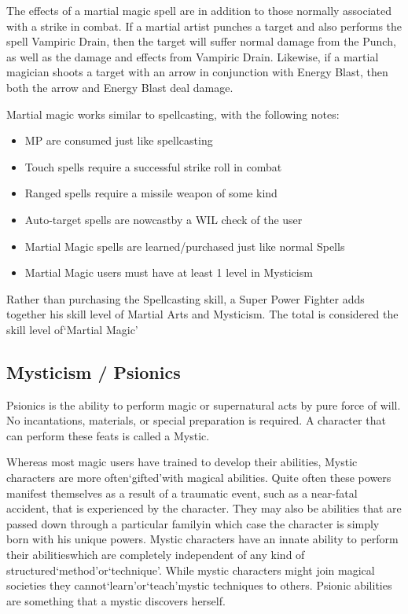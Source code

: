 \documentclass[twoside]{book}
\begin{document}
    {  
    The effects of a martial magic spell are in addition to those normally associated with a strike in combat. If a martial artist punches a target and also performs the spell Vampiric Drain, then the target will suffer normal damage from the Punch, as well as the damage and effects from Vampiric Drain. Likewise, if a martial magician shoots a target with an arrow in conjunction with Energy Blast, then both the arrow and Energy Blast deal damage.
    }
  
    {  
    Martial magic works similar to spellcasting, with the following notes:
    }
  
\begin{itemize}
      
  \item MP are consumed just like spellcasting
  \item Touch spells require a successful strike roll in combat
  \item Ranged spells require a missile weapon of some kind
  \item Auto-target spells are nowcastby a WIL check of the user
  \item Martial Magic spells are learned/purchased just like normal Spells
  \item Martial Magic users must have at least 1 level in Mysticism
\end{itemize}
  
    {  
    Rather than purchasing the Spellcasting skill, a Super Power Fighter adds together his skill level of Martial Arts and Mysticism. The total is considered the skill level of`Martial Magic'
    }
  
    

\subsection{Mysticism / Psionics}
    
    {  
    Psionics is the ability to perform magic or supernatural acts by pure force of will. No incantations, materials, or special preparation is required. A character that can perform these feats is called a Mystic.
    }
  
    {  
    Whereas most magic users have trained to develop their abilities, Mystic characters are more often`gifted'with magical abilities. Quite often these powers manifest themselves as a result of a traumatic event, such as a near-fatal accident, that is experienced by the character. They may also be abilities that are passed down through a particular familyin which case the character is simply born with his unique powers. Mystic characters have an innate ability to perform their abilitieswhich are completely independent of any kind of structured`method'or`technique'. While mystic characters might join magical societies they cannot`learn'or`teach'mystic techniques to others. Psionic abilities are something that a mystic discovers herself.
    }
  
\end{document}
